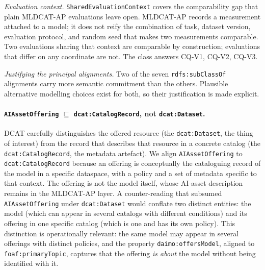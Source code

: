 \documentclass[Afour,sagev,times]{sagej}
\newcommand{\code}[1]{\texttt{#1}}
\begin{document}
\medskip\noindent\emph{Evaluation context.}
\code{SharedEvaluationContext} covers the comparability gap that plain MLDCAT-AP evaluations leave open. MLDCAT-AP records a measurement attached to a model; it does not reify the combination of task, dataset version, evaluation protocol, and random seed that makes two measurements comparable. Two evaluations sharing that context are comparable by construction; evaluations that differ on any coordinate are not. The class answers CQ-V1, CQ-V2, CQ-V3.

\medskip\noindent\emph{Justifying the principal alignments.}\label{sec:alignment-defense}
Two of the seven \code{rdfs:subClassOf} alignments carry more semantic commitment than the others. Plausible alternative modelling choices exist for both, so their justification is made explicit.

\paragraph{\code{AIAssetOffering} $\sqsubseteq$ \code{dcat:CatalogRecord}, not \code{dcat:Dataset}.} DCAT carefully distinguishes the offered resource (the \code{dcat:Dataset}, the thing of interest) from the record that describes that resource in a concrete catalog (the \code{dcat:CatalogRecord}, the metadata artefact). We align \code{AIAssetOffering} to \code{dcat:CatalogRecord} because an offering is conceptually the cataloguing record of the model in a specific dataspace, with a policy and a set of metadata specific to that context. The offering is not the model itself, whose AI-asset description remains in the MLDCAT-AP layer. A counter-reading that subsumed \code{AIAssetOffering} under \code{dcat:Dataset} would conflate two distinct entities: the model (which can appear in several catalogs with different conditions) and its offering in one specific catalog (which is one and has its own policy). This distinction is operationally relevant: the same model may appear in several offerings with distinct policies, and the property \code{daimo:offersModel}, aligned to \code{foaf:primaryTopic}, captures that the offering \emph{is about} the model without being identified with it.
\end{document}
